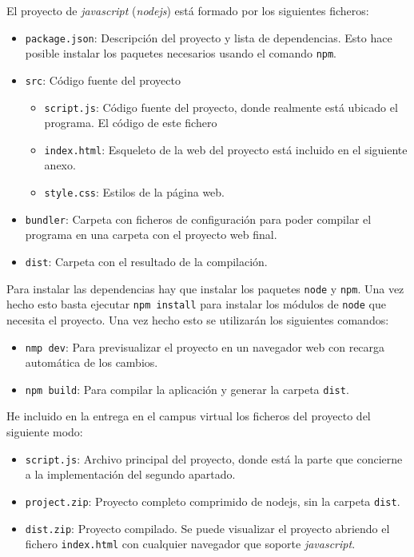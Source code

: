 \documentclass[10pt, spanish]{article}
\theoremstyle{definition}
\theoremstyle{break}
\begin{document}
El proyecto de \textit{javascript} (\textit{nodejs}) está formado por los
siguientes ficheros:

\begin{itemize}
    \item \texttt{package.json}: Descripción del proyecto y lista de
        dependencias. Esto hace posible instalar los paquetes necesarios usando el comando \texttt{npm}.
    \item \texttt{src}: Código fuente del proyecto
        \begin{itemize}
            \item \texttt{script.js}: Código fuente del proyecto, donde realmente está ubicado el programa. El código de este fichero
            \item \texttt{index.html}: Esqueleto de la web del proyecto
                está incluido en el siguiente anexo.
            \item \texttt{style.css}: Estilos de la página web.
        \end{itemize}
    \item \texttt{bundler}: Carpeta con ficheros de configuración para poder
        compilar el programa en una carpeta con el proyecto web final.
    \item \texttt{dist}: Carpeta con el resultado de la compilación.
\end{itemize}

Para instalar las dependencias hay que instalar los paquetes \texttt{node} y
\texttt{npm}. Una vez hecho esto basta ejecutar \texttt{npm install} para
instalar los módulos de \texttt{node} que necesita el proyecto. Una vez hecho
esto se utilizarán los siguientes comandos:
\begin{itemize}
    \item \texttt{nmp dev}: Para previsualizar el proyecto en un navegador web
        con recarga automática de los cambios.
    \item \texttt{npm build}: Para compilar la aplicación y generar la carpeta
        \texttt{dist}.
\end{itemize}

He incluido en la entrega en el campus virtual los ficheros del proyecto del siguiente modo:
\begin{itemize}
    \item \texttt{script.js}: Archivo principal del proyecto, donde está la
        parte que concierne a la implementación del segundo apartado.
    \item \texttt{project.zip}: Proyecto completo comprimido de nodejs, sin la
        carpeta \texttt{dist}.
    \item \texttt{dist.zip}: Proyecto compilado. Se puede visualizar el proyecto
        abriendo el fichero \texttt{index.html} con cualquier navegador que
        soporte \textit{javascript}.
\end{itemize}
\end{document}

